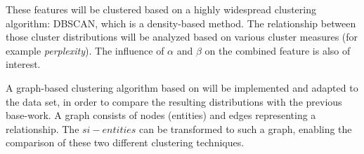 These features will be clustered based on a highly widespread clustering algorithm: DBSCAN, which is a density-based method.
The relationship between those cluster distributions will be analyzed based on various cluster measures (for example \emph{perplexity}). The influence of $\alpha$ and $\beta$ on the combined feature is also of interest.

A graph-based clustering algorithm based on \cite{Zhou2009} will be implemented and adapted to the data set, in order to compare the resulting distributions with the previous base-work. A graph consists of nodes (entities) and edges representing a relationship. The $si-entities$ can be transformed to such a graph, enabling the comparison of these two different clustering techniques.

